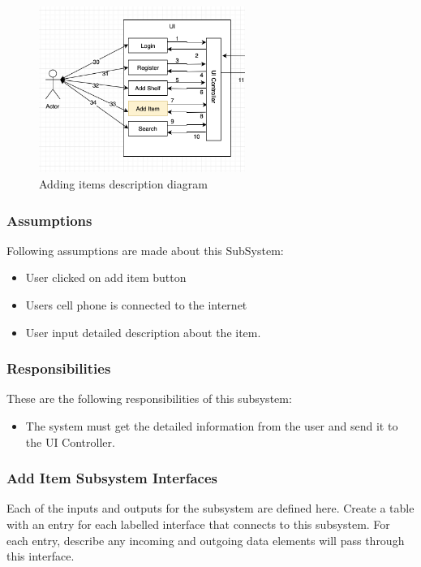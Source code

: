 \begin{figure}[h!]
	\centering
 	\includegraphics[width=0.60\textwidth]{images/additem}

 \caption{Adding items description diagram}

\end{figure}

\subsubsection{Assumptions}
Following assumptions are made about this SubSystem:
\begin{itemize}
    \item User clicked on add item button
    \item Users cell phone is connected to the internet
    \item User input detailed description about the item.
\end{itemize}

\subsubsection{Responsibilities}
These are the following responsibilities of this subsystem:
\begin{itemize}
    \item The system must get the detailed information from the user and send it to the UI Controller.
\end{itemize}

\subsubsection{Add Item Subsystem Interfaces}
Each of the inputs and outputs for the subsystem are defined here. Create a table with an entry for each labelled interface that connects to this subsystem. For each entry, describe any incoming and outgoing data elements will pass through this interface.

